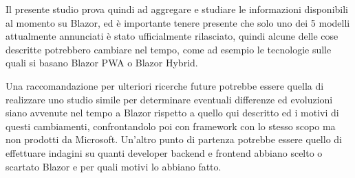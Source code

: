 Il presente studio prova quindi ad aggregare e studiare le informazioni disponibili al momento su Blazor, ed \`e importante tenere presente che solo uno dei 5 modelli attualmente annunciati \`e stato ufficialmente rilasciato, quindi alcune delle cose descritte potrebbero cambiare nel tempo, come ad esempio le tecnologie sulle quali si basano Blazor PWA o Blazor Hybrid.

Una raccomandazione per ulteriori ricerche future potrebbe essere quella di realizzare uno studio simile per determinare eventuali differenze ed evoluzioni siano avvenute nel tempo a Blazor rispetto a quello qui descritto ed i motivi di questi cambiamenti, confrontandolo poi con framework con lo stesso scopo ma non prodotti da Microsoft.
Un'altro punto di partenza potrebbe essere quello di effettuare indagini su quanti developer backend e frontend abbiano scelto o scartato Blazor e per quali motivi lo abbiano fatto.